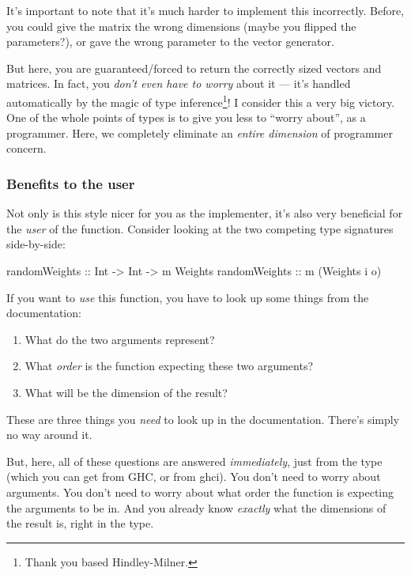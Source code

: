 \documentclass[]{article}
\newenvironment{Shaded}{}{}
\newcommand{\DataTypeTok}[1]{\textcolor[rgb]{0.56,0.13,0.00}{#1}}
\newcommand{\NormalTok}[1]{#1}
\newcommand{\OtherTok}[1]{\textcolor[rgb]{0.00,0.44,0.13}{#1}}
\begin{document}
It's important to note that it's much harder to implement this incorrectly.
Before, you could give the matrix the wrong dimensions (maybe you flipped the
parameters?), or gave the wrong parameter to the vector generator.

But here, you are guaranteed/forced to return the correctly sized vectors and
matrices. In fact, you \emph{don't even have to worry} about it --- it's handled
automatically by the magic of type inference\footnote{Thank you based
  Hindley-Milner.}! I consider this a very big victory. One of the whole points
of types is to give you less to ``worry about'', as a programmer. Here, we
completely eliminate an \emph{entire dimension} of programmer concern.

\hypertarget{benefits-to-the-user}{%
\subsubsection{Benefits to the user}\label{benefits-to-the-user}}

Not only is this style nicer for you as the implementer, it's also very
beneficial for the \emph{user} of the function. Consider looking at the two
competing type signatures side-by-side:

\begin{Shaded}
\begin{Highlighting}[]
\OtherTok{randomWeights ::} \DataTypeTok{Int} \OtherTok{->} \DataTypeTok{Int} \OtherTok{->}\NormalTok{ m }\DataTypeTok{Weights}
\OtherTok{randomWeights ::}\NormalTok{               m (}\DataTypeTok{Weights}\NormalTok{ i o)}
\end{Highlighting}
\end{Shaded}

If you want to \emph{use} this function, you have to look up some things from
the documentation:

\begin{enumerate}
\def\labelenumi{\arabic{enumi}.}
\tightlist
\item
  What do the two arguments represent?
\item
  What \emph{order} is the function expecting these two arguments?
\item
  What will be the dimension of the result?
\end{enumerate}

These are three things you \emph{need} to look up in the documentation. There's
simply no way around it.

But, here, all of these questions are answered \emph{immediately}, just from the
type (which you can get from GHC, or from ghci). You don't need to worry about
arguments. You don't need to worry about what order the function is expecting
the arguments to be in. And you already know \emph{exactly} what the dimensions
of the result is, right in the type.
\end{document}
